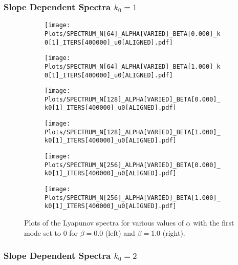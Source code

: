\documentclass[9pt]{article}
\begin{document}
\subsubsection*{Slope Dependent Spectra $k_0 = 1$}
\begin{figure}[h!]
  \centering
  \begin{subfigure}[b]{0.49\linewidth}
    \texttt{[image: Plots/SPECTRUM\_N[64]\_ALPHA[VARIED]\_BETA[0.000]\_k0[1]\_ITERS[400000]\_u0[ALIGNED].pdf]}
    \caption{}
  \end{subfigure}
  \begin{subfigure}[b]{0.49\linewidth}
    \texttt{[image: Plots/SPECTRUM\_N[64]\_ALPHA[VARIED]\_BETA[1.000]\_k0[1]\_ITERS[400000]\_u0[ALIGNED].pdf]}
    \caption{}
  \end{subfigure}
  \begin{subfigure}[b]{0.49\linewidth}
    \texttt{[image: Plots/SPECTRUM\_N[128]\_ALPHA[VARIED]\_BETA[0.000]\_k0[1]\_ITERS[400000]\_u0[ALIGNED].pdf]}
    \caption{}
  \end{subfigure}
  \begin{subfigure}[b]{0.49\linewidth}
    \texttt{[image: Plots/SPECTRUM\_N[128]\_ALPHA[VARIED]\_BETA[1.000]\_k0[1]\_ITERS[400000]\_u0[ALIGNED].pdf]}
    \caption{}
  \end{subfigure}
  \begin{subfigure}[b]{0.49\linewidth}
    \texttt{[image: Plots/SPECTRUM\_N[256]\_ALPHA[VARIED]\_BETA[0.000]\_k0[1]\_ITERS[400000]\_u0[ALIGNED].pdf]}
    \caption{}
  \end{subfigure}
  \begin{subfigure}[b]{0.49\linewidth}
    \texttt{[image: Plots/SPECTRUM\_N[256]\_ALPHA[VARIED]\_BETA[1.000]\_k0[1]\_ITERS[400000]\_u0[ALIGNED].pdf]}
    \caption{}
  \end{subfigure}
  \caption{Plots of the Lyapunov spectra for various values of $\alpha$ with the first mode set to 0 for $\beta = 0.0$ (left) and $\beta = 1.0$ (right).}
  \label{fig:3}
\end{figure}

\newpage
\subsubsection*{Slope Dependent Spectra $k_0 = 2$}
\end{document}
